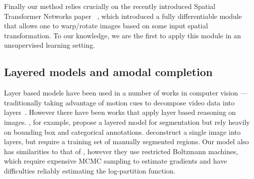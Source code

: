 Finally our method relies crucially on the recently introduced Spatial
Transformer Networks paper
 ~\citep{jaderberg2015spatial}, which introduced 
a fully differentiable module that allows one to warp/rotate images based on some input spatial transformation.
To our knowledge, we are the first to apply this module in an unsupervised learning setting.  

\vspace{-2mm}
\subsection{Layered models and amodal completion}\vspace{-2mm}
Layer based models have been used in a number of works in computer vision  --- traditionally
taking advantage of motion cues to decompose video data into layers~\citep{wang1994representing,ayer1995layered,kannan2005generative}.
However there have been works that apply layer based reasoning on images.
\cite{yang2012layered}, for example, propose a layered model for
segmentation but rely heavily on bounding box and categorical
annotations.	
\cite{Isola2013} deconstruct a single image into layers, but require a
training set of manually segmented regions.
Our model also has similarities to that of \cite{le2011learning}, however  they use restricted Boltzmann machines, 
which require expensive MCMC sampling to estimate gradients and have difficulties reliably estimating the 
log-partition function.  
\vspace{-2mm}
	
	
	


	
	
	
		
	
	
	
	
	
	
	
